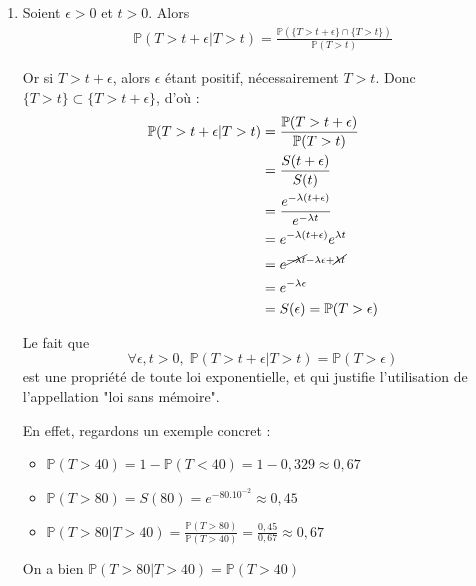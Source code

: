 \documentclass[a4paper,oneside,12pt]{article}
\theoremstyle{plain}
\newtheorem*{remark}{Remarque}
\def\P{{\mathbb P}}
\begin{document}
\begin{enumerate}
    Cela signifie que la moitié des cellules vit plus de 69,3 jours et que l'autre moitié vit moins de 69,3 jours.
    
    \begin{remark}
        On aurait pu aussi faire le même raisonnement avec la fonction de répartition à la place de la fonction de survie, le résultat aurait été identique.
    \end{remark}
    
    \item Soient $\epsilon > 0$ et $t> 0$. Alors 
    \begin{align*}
        \P(T> t+\epsilon | T> t) = \frac{\P(\{T> t+\epsilon\}\cap \{T> t\})}{\P(T>t)}
    \end{align*}
    
    Or si $T>t+\epsilon$, alors $\epsilon$ étant positif, nécessairement $T>t$. Donc $\{T> t\}\subset \{T> t+\epsilon\}$, d'où :
        \begin{align*}
        \P(T> t+\epsilon | T> t) &= \frac{\P(T> t+\epsilon)}{\P(T>t)}\\
        &= \frac{S(t+\epsilon)}{S(t)}\\
        &=\frac{e^{-\lambda(t+\epsilon)}}{e^{-\lambda t}}\\
        &=e^{-\lambda(t+\epsilon)}e^{\lambda t}\\
        &=e^{\cancel{-\lambda t }-\lambda \epsilon +\cancel{\lambda t}}\\
        &=e^{-\lambda \epsilon} \\
        &= S(\epsilon) = \P(T>\epsilon)
    \end{align*}
    
    Le fait que 
    $$\forall \epsilon, t > 0, \; \P(T> t+\epsilon | T> t) = \P(T>\epsilon)$$
    est une propriété de toute loi exponentielle, et qui justifie l'utilisation de l'appellation "loi sans mémoire".
    
    En effet, regardons un exemple concret :
    \begin{itemize}
        \item $\P(T>40) = 1 - \P(T<40) = 1- 0,329 \approx 0,67$
        \item $\P(T>80) = S(80) = e^{-80.10^{-2}} \approx 0,45$
        \item $\P(T> 80 | T>40) = \frac{\P(T>80)}{\P(T>40)} = \frac{0,45}{0,67} \approx 0,67$
    \end{itemize}
    
    On a bien $\P(T> 80 | T>40) = \P(T>40)$
    

\end{enumerate}
\end{document}
